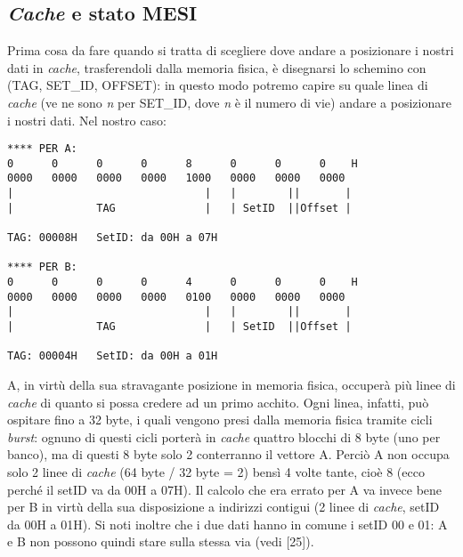 \subsection{\textit{Cache} e stato MESI}

Prima cosa da fare quando si tratta di scegliere dove andare a posizionare i nostri dati in \textit{cache}, trasferendoli dalla memoria fisica, è disegnarsi lo schemino con (TAG, SET\_ID, OFFSET): in questo modo potremo capire su quale linea di \textit{cache} (ve ne sono \textit{n} per SET\_ID, dove \textit{n} è il numero di vie) andare a posizionare i nostri dati.
Nel nostro caso:
\begin{verbatim}
**** PER A:
0      0      0      0      8      0      0      0    H 
0000   0000   0000   0000   1000   0000   0000   0000
|                              |   |        ||       |
|             TAG              |   | SetID  ||Offset |

TAG: 00008H   SetID: da 00H a 07H

**** PER B:
0      0      0      0      4      0      0      0    H 
0000   0000   0000   0000   0100   0000   0000   0000
|                              |   |        ||       |
|             TAG              |   | SetID  ||Offset |

TAG: 00004H   SetID: da 00H a 01H
\end{verbatim}

A, in virtù della sua stravagante posizione in memoria fisica, occuperà più linee di \textit{cache} di quanto si possa credere ad un primo acchito. Ogni linea, infatti, può ospitare fino a 32 byte, i quali vengono presi dalla memoria fisica tramite cicli \textit{burst}: ognuno di questi cicli porterà in \textit{cache} quattro blocchi di 8 byte (uno per banco), ma di questi 8 byte solo 2 conterranno il vettore A. Perciò A non occupa solo 2 linee di \textit{cache} (64 byte / 32 byte = 2) bensì 4 volte tante, cioè 8 (ecco perché il setID va da 00H a 07H).
Il calcolo che era errato per A va invece bene per B in virtù della sua disposizione a indirizzi contigui (2 linee di \textit{cache}, setID da 00H a 01H).
Si noti inoltre che i due dati hanno in comune i setID 00 e 01: A e B non possono quindi stare sulla stessa via (vedi [25]).

